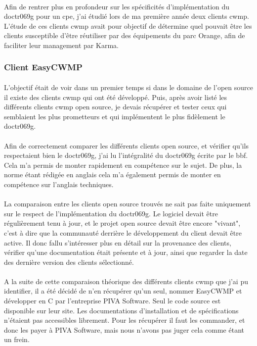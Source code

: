 \documentclass[12pt,a4paper]{report}
\begin{document}
\paragraph*{}Afin de rentrer plus en profondeur sur les spécificités d'implémentation du \gls{doctr069g} pour un \gls{cpe}, j'ai étudié lors de ma première année deux clients \gls{cwmp}. L'étude de ces clients \gls{cwmp} avait pour objectif de détermine quel pouvait être les clients susceptible d'être réutiliser par des équipements du parc Orange, afin de faciliter leur management par Karma. \\
\subsubsection{Client EasyCWMP}
\paragraph*{}L’objectif était de voir dans un premier temps si dans le domaine de l’open source il existe des clients \gls{cwmp} qui ont été développé. Puis, après avoir listé les différents clients \gls{cwmp} open source, je devais récupérer et tester ceux qui semblaient les plus prometteurs et qui implémentent le plus fidèlement le \gls{doctr069g}.
\paragraph*{}Afin de correctement comparer les différents clients open source, et vérifier qu’ils respectaient bien le \gls{doctr069g}, j’ai lu l’intégralité du \gls{doctr069g} écrite par le \gls{bbf}. Cela m’a permis de monter rapidement en compétence sur le sujet. De plus, la norme étant rédigée en anglais cela m’a également permis de monter en compétence sur l'anglais techniques.
\paragraph*{}La comparaison entre les clients open source trouvés ne sait pas faite uniquement sur le respect de l'implémentation du \gls{doctr069g}. Le logiciel devait être régulièrement tenu à jour, et le projet open source devait être encore "vivant", c'est à dire que la communauté derrière le développement du client devait être active. Il donc fallu s'intéresser plus en détail sur la provenance des clients, vérifier qu'une documentation était présente et à jour, ainsi que regarder la date des dernière version des clients sélectionné.
\paragraph*{}A la suite de cette comparaison théorique des différents clients \gls{cwmp} que j’ai pu identifier, il a été décidé de n’en récupérer qu’un seul, nommer EasyCWMP et développer en C par l’entreprise PIVA Software. Seul le code source est disponible sur leur site. Les documentations d’installation et de spécifications n’étaient pas accessibles librement. Pour les récupérer il faut les commander, et donc les payer à PIVA Software, mais nous n'avons pas juger cela comme étant un frein.
\end{document}
